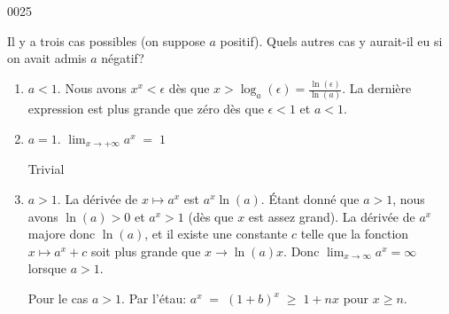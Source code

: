 \begin{corrige}{0025}
\begin{enumerate}
Il y a trois cas possibles (on suppose $a$ positif). Quels autres cas y aurait-il eu si on avait admis $a$ négatif?

\begin{enumerate}
	\item 
	$a< 1$.
	Nous avons $x^x<\epsilon$ dès que $x>\log_a(\epsilon)=\frac{ \ln(\epsilon) }{ \ln(a) }$. La dernière expression est plus grande que zéro dès que $\epsilon<1$ et $a<1$.


	\item
	 $a= 1$.
	$\lim_{x\rightarrow +\infty} a^x  \;= \;1$ 

	Trivial

	\item
	 $a> 1$. La dérivée de $x\mapsto a^x$ est $a^x\ln(a)$. Étant donné que $a>1$, nous avons $\ln(a)>0$ et $a^x>1$ (dès que $x$ est assez grand). La dérivée de $a^x$ majore donc $\ln(a)$, et il existe une constante $c$ telle que  la fonction $x\mapsto a^x+c$ soit plus grande que $x\to \ln(a)x$. Donc $\lim_{x\to\infty}a^x=\infty$ lorsque $a>1$.

\begin{alternative}
	Pour le cas $a>1$. Par l'étau: $a^x \; = \; (1+b)^x \; \geq \; 1+nx$ pour $x\geq n$. 
\end{alternative}

\end{enumerate}
\end{enumerate}


\end{corrige}
